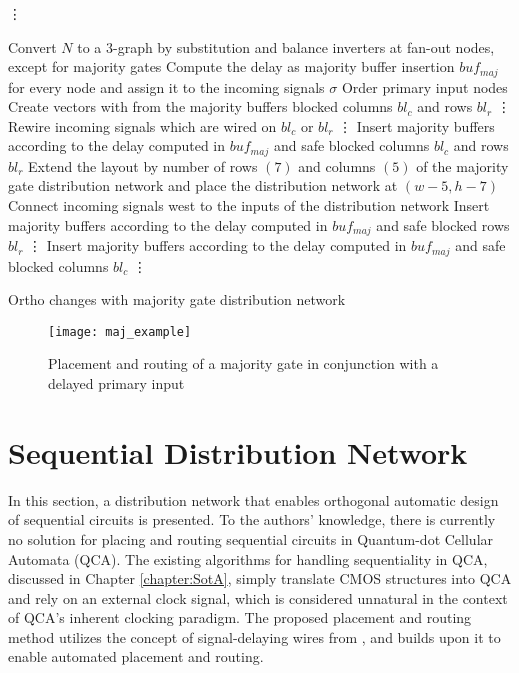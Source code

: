 \begin{algorithm}[H]
	\vdots
	
	\begin{algorithmic}
		\State Convert $N$ to a 3-graph by substitution and balance inverters at fan-out nodes, except for majority gates
		\State Compute the delay as majority buffer insertion $buf_{maj}$ for every node and assign it to the incoming signals $\sigma$
		\State Order primary input nodes
		\State Create vectors with from the majority buffers blocked columns $bl_c$ and rows $bl_r$
		\State \vdots
		\State Rewire incoming signals which are wired on $bl_c$ or $bl_r$
		\State \vdots
		\EndIf
		\State Insert majority buffers according to the delay computed in $buf_{maj}$ and safe blocked columns $bl_c$ and rows $bl_r$
		\State Extend the layout by number of rows $(7)$ and columns $(5)$ of the majority gate distribution network and place the distribution network at $(w-5, h-7)$
		\State Connect incoming signals west to the inputs of the distribution network
		\State Insert majority buffers according to the delay computed in $buf_{maj}$ and safe blocked rows $bl_r$
		\State \vdots
		\State Insert majority buffers according to the delay computed in $buf_{maj}$ and safe blocked columns $bl_c$
		\State \vdots
		\EndIf
		
		\EndFor
	\end{algorithmic}
	\caption{Ortho changes with majority gate distribution network}\label{alg:majority_network}
\end{algorithm}

\begin{figure}
	\centering
	\texttt{[image: maj\_example]}
	\caption{Placement and routing of a majority gate in conjunction with a delayed primary input}\label{fig:majority_with_buf}
\end{figure}


\section{Sequential Distribution Network}
In this section, a distribution network that enables orthogonal automatic design of sequential circuits is presented. To the authors' knowledge, there is currently no solution for placing and routing sequential circuits in Quantum-dot Cellular Automata (QCA). The existing algorithms for handling sequentiality in QCA, discussed in Chapter \ref{chapter:SotA}, simply translate CMOS structures into QCA and rely on an external clock signal, which is considered unnatural in the context of QCA's inherent clocking paradigm. The proposed placement and routing method utilizes the concept of signal-delaying wires from \cite{Walter}, and builds upon it to enable automated placement and routing.


